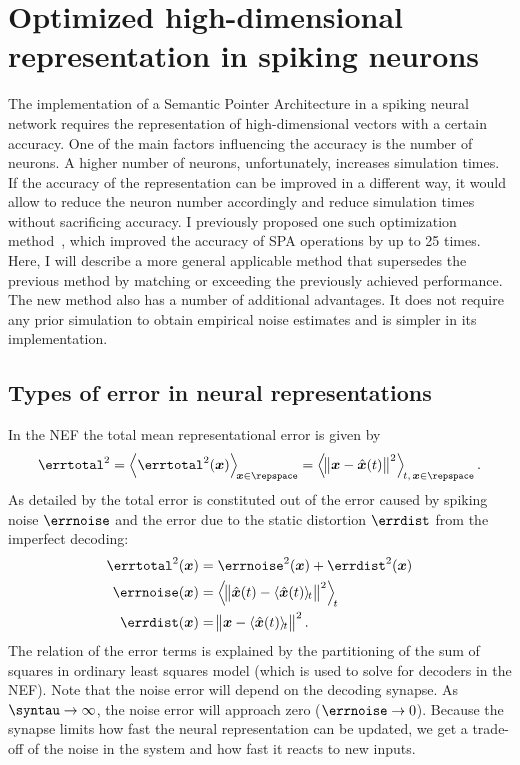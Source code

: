 \chapter{Optimized high-dimensional representation in spiking neurons}
The implementation of a Semantic Pointer Architecture in a spiking neural network requires the representation of high-dimensional vectors with a certain accuracy.
One of the main factors influencing the accuracy is the number of neurons.
A higher number of neurons, unfortunately, increases simulation times.
If the accuracy of the representation can be improved in a different way, it would allow to reduce the neuron number accordingly and reduce simulation times without sacrificing accuracy.
I previously proposed one such optimization method~\parencite{gosmann216}, which improved the accuracy of SPA operations by up to 25 times.
Here, I will describe a more general applicable method that supersedes the previous method by matching or exceeding the previously achieved performance.
The new method also has a number of additional advantages.
It does not require any prior simulation to obtain empirical noise estimates and is simpler in its implementation.

\section{Types of error in neural representations}
In the NEF the total mean representational error is given by
\begin{equation}
    \errtotal^2 = \left\langle \errtotal^2(\vc x) \right\rangle_{\!\vc x \in \repspace} = \left\langle \norm{\vc x - \hat{\vc x}(t)}^2 \right\rangle_{\!t,\,\vc x \in \repspace} \text{.}
\end{equation}
As detailed by \textcite[47--48]{eliasmith2003} the total error is constituted out of the error caused by spiking noise $\errnoise$ and the error due to the static distortion $\errdist$ from the imperfect decoding:
\begin{align}
    \errtotal^2(\vc x) &= \errnoise^2(\vc x) + \errdist^2(\vc x) \\
    \errnoise(\vc x) &= \left\langle \norm{\hat{\vc x}(t) - \langle \hat{\vc x}(t) \rangle_{\!t}}^2 \right\rangle_{\!t} \\
    \errdist(\vc x) &= \norm{\vc x - \langle \hat{\vc x}(t) \rangle_{\!t}}^2 \text{.}
\end{align}
The relation of the error terms is explained by the partitioning of the sum of squares in ordinary least squares model (which is used to solve for decoders in the NEF).
Note that the noise error will depend on the decoding synapse.
As $\syntau \rightarrow \infty$, the noise error will approach zero ($\errnoise \rightarrow 0$).
Because the synapse limits how fast the neural representation can be updated, we get a trade-off of the noise in the system and how fast it reacts to new inputs.

